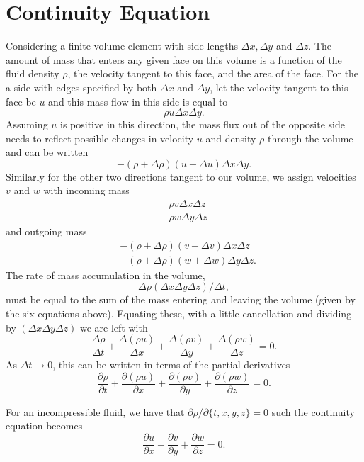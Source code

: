 \documentclass[12pt]{report}
\begin{document}
\section{Continuity Equation}

Considering a finite volume element with side lengths $\Delta x, \Delta y$ and $\Delta z$.
The amount of mass that enters any given face on this volume is a function of the fluid density $\rho$, the velocity tangent to this face, and the area of the face.
For the a side with edges specified by both $\Delta x$ and $\Delta y$, let the velocity tangent to this face be $u$ and this mass flow in this side is equal to
$$ \rho u \Delta x \Delta y .$$
Assuming $u$ is positive in this direction, the mass flux out of the opposite side needs to reflect possible changes in velocity $u$ and density $\rho$ through the volume and can be written
$$ -(\rho + \Delta \rho) (u+\Delta u) \Delta x \Delta y.$$
Similarly for the other two directions tangent to our volume, we assign velocities $v$ and $w$ with incoming mass
\begin{align*} &\rho v \Delta x \Delta z\\
&\rho w \Delta y \Delta z\end{align*}
and outgoing mass
\begin{align*} &-(\rho + \Delta \rho )( v+ \Delta v) \Delta x \Delta z\\
&-(\rho+\Delta \rho) (w+\Delta w) \Delta y \Delta z.\end{align*}
The rate of mass accumulation in the volume,
$$ \Delta \rho (\Delta x \Delta y \Delta z) / \Delta t, $$
must be equal to the sum of the mass entering and leaving the volume (given by the six equations above).
Equating these, with a little cancellation and dividing by $(\Delta x \Delta y \Delta z)$ we are left with
\begin{equation} \frac{\Delta \rho}{\Delta t} + \frac{\Delta (\rho u)}{\Delta x} + \frac{\Delta (\rho v)}{\Delta y} + \frac{\Delta (\rho w)}{\Delta z} = 0. \end{equation}
As $\Delta t \to 0$, this can be written in terms of the partial derivatives
\begin{equation} \frac{\partial \rho}{\partial t} + \frac{\partial (\rho u)}{\partial x} + \frac{\partial (\rho v)}{\partial y} + \frac{\partial (\rho w)}{\partial z} = 0. \label{eq:NScont} \end{equation}

For an incompressible fluid, we have that $\partial \rho / \partial \{ t,x,y,z\} = 0$ such the continuity equation becomes
\begin{equation} \frac{\partial u}{\partial x} + \frac{\partial v}{\partial y} + \frac{\partial w}{\partial z} = 0. \label{eq:NScontIco} \end{equation}
\end{document}
